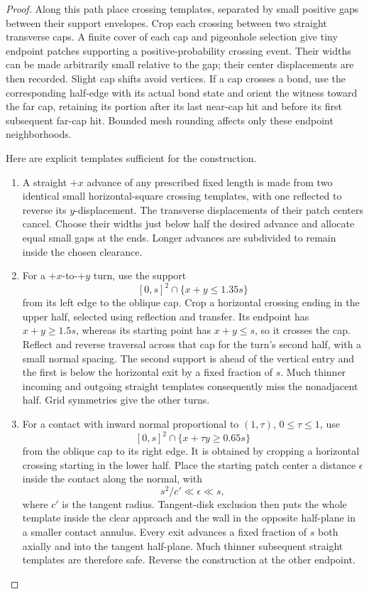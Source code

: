 \begin{proof}
Along this path place crossing templates, separated by small
positive gaps between their support envelopes.  Crop each
crossing between two straight transverse caps.  A finite
cover of each cap and pigeonhole selection give tiny endpoint
patches supporting a positive-probability crossing event.
Their widths can be made arbitrarily small relative to the
gap; their center displacements are then recorded.  Slight
cap shifts avoid vertices.  If a cap crosses a bond, use
the corresponding half-edge with its actual bond state and
orient the witness toward the far cap, retaining its portion after
its last near-cap hit and before its first subsequent far-cap hit.  Bounded
mesh rounding affects only these endpoint neighborhoods.

Here are explicit templates sufficient for the construction.
\begin{enumerate}[label=(\roman*)]
\item A straight \(+x\) advance of any prescribed fixed length
is made from two identical small horizontal-square crossing
templates, with one reflected to reverse its \(y\)-displacement.
The transverse displacements of their patch centers cancel.
Choose their widths just below half the desired advance and
allocate equal small gaps at the ends.  Longer advances are
subdivided to remain inside the chosen clearance.
\item For a \(+x\)-to-\(+y\) turn, use the support
\[
 [0,s]^2\cap\{x+y\le1.35s\}
\]
from its left edge to the oblique cap.  Crop a horizontal
crossing ending in the upper half, selected using reflection
and transfer.  Its endpoint has \(x+y\ge1.5s\), whereas its
starting point has \(x+y\le s\), so it crosses the cap.
Reflect and reverse traversal across that cap for the turn's
second half, with a small normal spacing.  The second support
is ahead of the vertical entry and the first is below the
horizontal exit by a fixed fraction of \(s\).  Much thinner
incoming and outgoing straight templates consequently miss
the nonadjacent half.  Grid symmetries give the other turns.
\item For a contact with inward normal proportional to
\((1,\tau)\), \(0\le\tau\le1\), use
\[
 [0,s]^2\cap\{x+\tau y\ge0.65s\}
\]
from the oblique cap to its right edge.  It is obtained by
cropping a horizontal crossing starting in the lower half.
Place the starting patch center a distance \(\epsilon\)
inside the contact along the normal, with
\[
 s^2/c'\ll\epsilon\ll s,
\]
where \(c'\) is the tangent radius.  Tangent-disk exclusion
then puts the whole template inside the clear approach and
the wall in the opposite half-plane in a smaller contact
annulus.  Every exit advances a fixed fraction of \(s\)
both axially and into the tangent half-plane.  Much thinner
subsequent straight templates are therefore safe.  Reverse
the construction at the other endpoint.
\end{enumerate}


\end{proof}
